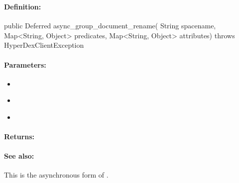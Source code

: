 \pagebreak
\subsubsection{}
\label{api:java:async_group_document_rename}


\paragraph{Definition:}
\begin{javacode}
public Deferred async_group_document_rename(
        String spacename,
        Map<String, Object> predicates,
        Map<String, Object> attributes) throws HyperDexClientException
\end{javacode}

\paragraph{Parameters:}
\begin{itemize}[noitemsep]
\item {}\\

\item {}\\

\item {}\\

\end{itemize}

\paragraph{Returns:}


\paragraph{See also:}  This is the asynchronous form of .

\pagebreak
\subsubsection{}
\label{api:java:document_unset}


